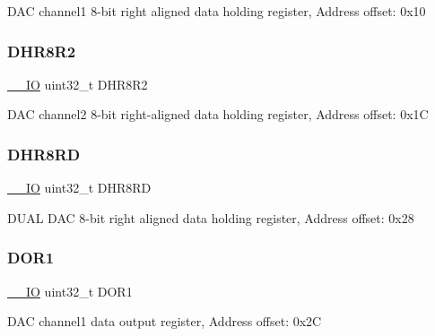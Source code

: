 D\+AC channel1 8-\/bit right aligned data holding register, Address offset\+: 0x10 \mbox{\label{struct_d_a_c___type_def_a4c435f0e34ace4421241cd5c3ae87fc2}} 
\subsubsection{\texorpdfstring{D\+H\+R8\+R2}{DHR8R2}}
{\footnotesize\ttfamily \mbox{\hyperlink{core__sc300_8h_aec43007d9998a0a0e01faede4133d6be}{\+\_\+\+\_\+\+IO}} uint32\+\_\+t D\+H\+R8\+R2}

D\+AC channel2 8-\/bit right-\/aligned data holding register, Address offset\+: 0x1C \mbox{\label{struct_d_a_c___type_def_a9590269cba8412f1be96b0ddb846ef44}} 
\subsubsection{\texorpdfstring{D\+H\+R8\+RD}{DHR8RD}}
{\footnotesize\ttfamily \mbox{\hyperlink{core__sc300_8h_aec43007d9998a0a0e01faede4133d6be}{\+\_\+\+\_\+\+IO}} uint32\+\_\+t D\+H\+R8\+RD}

D\+U\+AL D\+AC 8-\/bit right aligned data holding register, Address offset\+: 0x28 \mbox{\label{struct_d_a_c___type_def_aa710505be03a41981c35bacc7ce20746}} 
\subsubsection{\texorpdfstring{D\+O\+R1}{DOR1}}
{\footnotesize\ttfamily \mbox{\hyperlink{core__sc300_8h_aec43007d9998a0a0e01faede4133d6be}{\+\_\+\+\_\+\+IO}} uint32\+\_\+t D\+O\+R1}

D\+AC channel1 data output register, Address offset\+: 0x2C \mbox{\label{struct_d_a_c___type_def_aba9fb810b0cf6cbc1280c5c63be2418b}} 
